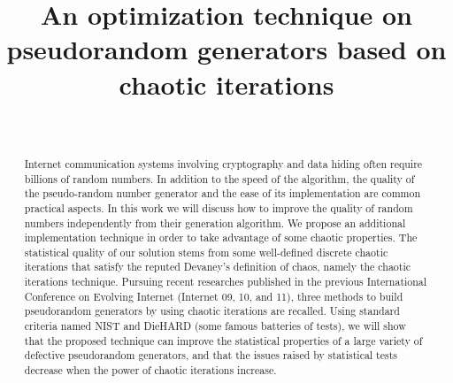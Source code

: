\documentclass[10pt, conference, compsocconf]{IEEEtran}
\begin{document}
\title{An optimization technique on pseudorandom generators based on chaotic iterations}


\author{
\\ }


%



\maketitle


\begin{abstract}
Internet communication systems involving cryptography and data hiding often require billions 
of random numbers. In addition to the speed of the algorithm, the quality of the pseudo-random number generator 
and the ease of its implementation are common practical aspects. In this work we will discuss how to improve the quality of 
random numbers independently from their
generation algorithm. We propose an additional implementation technique in order to take advantage of some 
chaotic properties. The statistical quality of our solution stems from some well-defined discrete chaotic iterations 
that satisfy the reputed Devaney's definition of chaos, namely
the chaotic iterations technique. Pursuing recent researches published in the previous International Conference 
on Evolving Internet (Internet 09, 10, and 11), three methods to build pseudorandom generators by using chaotic 
iterations are recalled. Using standard criteria named NIST and DieHARD (some famous batteries of tests), 
we will show that the proposed technique can improve the statistical properties of a 
large variety of defective pseudorandom generators, and that the issues raised by statistical 
tests decrease when the power of chaotic iterations increase.

\end{abstract}
\end{document}
